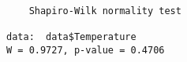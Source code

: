 \begin{verbatim} 

	Shapiro-Wilk normality test

data:  data$Temperature
W = 0.9727, p-value = 0.4706

\end{verbatim}